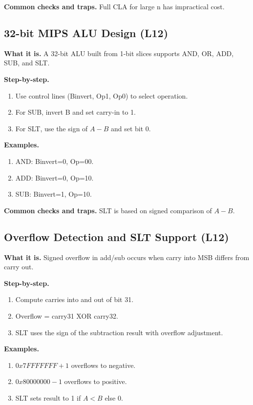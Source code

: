 \documentclass[11pt]{article}
\begin{document}
\textbf{Common checks and traps.} Full CLA for large n has impractical cost.

\subsection{32-bit MIPS ALU Design (L12)}
\textbf{What it is.} A 32-bit ALU built from 1-bit slices supports AND, OR, ADD, SUB, and SLT.

\textbf{Step-by-step.}
\begin{enumerate}[leftmargin=*]
  \item Use control lines (Binvert, Op1, Op0) to select operation.
  \item For SUB, invert B and set carry-in to 1.
  \item For SLT, use the sign of $A-B$ and set bit 0.
\end{enumerate}

\textbf{Examples.}
\begin{enumerate}[leftmargin=*]
  \item AND: Binvert=0, Op=00.
  \item ADD: Binvert=0, Op=10.
  \item SUB: Binvert=1, Op=10.
\end{enumerate}

\textbf{Common checks and traps.} SLT is based on signed comparison of $A-B$.

\subsection{Overflow Detection and SLT Support (L12)}
\textbf{What it is.} Signed overflow in add/sub occurs when carry into MSB differs from carry out.

\textbf{Step-by-step.}
\begin{enumerate}[leftmargin=*]
  \item Compute carries into and out of bit 31.
  \item Overflow = carry31 XOR carry32.
  \item SLT uses the sign of the subtraction result with overflow adjustment.
\end{enumerate}

\textbf{Examples.}
\begin{enumerate}[leftmargin=*]
  \item $0x7FFFFFFF + 1$ overflows to negative.
  \item $0x80000000 - 1$ overflows to positive.
  \item SLT sets result to 1 if $A < B$ else 0.
\end{enumerate}
\end{document}
